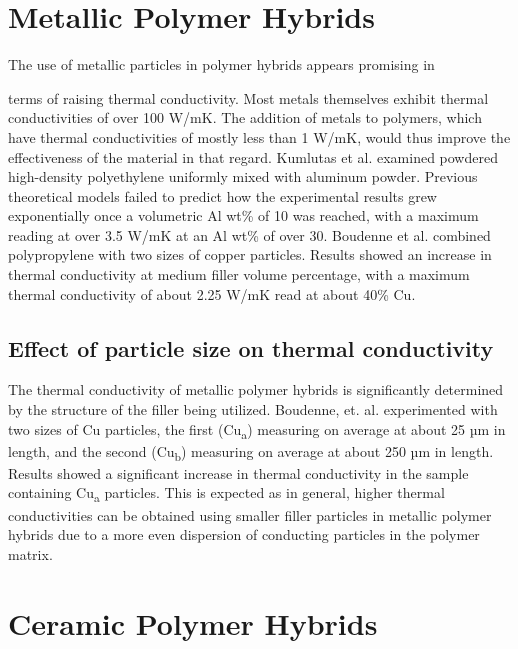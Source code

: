 \documentclass[11pt]{article}
\begin{document}
\begin{multicols}{2}
  
\section{Metallic Polymer Hybrids}

The use of metallic particles in polymer hybrids appears promising in

terms of raising thermal conductivity. Most metals themselves exhibit
thermal conductivities of over 100 W/mK. The addition of metals to
polymers, which have thermal conductivities of mostly less than 1 W/mK,
would thus improve the effectiveness of the material in that regard.
Kumlutas et al. examined powdered high-density polyethylene uniformly
mixed with aluminum powder. Previous theoretical models failed to
predict how the experimental results grew exponentially once a
volumetric Al wt\% of 10 was reached, with a maximum reading at over 3.5
W/mK at an Al wt\% of over 30.\cite{Boudenne-2005-1545}  Boudenne et al. combined
polypropylene with two sizes of copper particles. Results showed an
increase in thermal conductivity at medium filler volume percentage,
with a maximum thermal conductivity of about 2.25 W/mK read at about
40\% Cu.\cite{Boudenne-2005-1545}

\subsection{Effect of particle size on thermal conductivity}

The thermal conductivity of metallic polymer hybrids is significantly
determined by the structure of the filler being utilized. Boudenne, et.
al. experimented with two sizes of Cu particles, the first
(Cu\textsubscript{a}) measuring on average at about 25 µm in length, and
the second (Cu\textsubscript{b}) measuring on average at about 250 µm in
length. Results showed a significant increase in thermal conductivity in
the sample containing Cu\textsubscript{a} particles.\cite{Boudenne-2005-1545}  This is
expected as in general, higher thermal conductivities can be obtained
using smaller filler particles in metallic polymer hybrids due to a more
even dispersion of conducting particles in the polymer matrix.

\section{Ceramic Polymer Hybrids}


\end{multicols}
\end{document}
